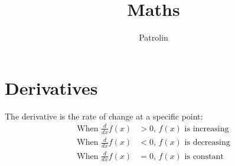 \documentclass[a4paper,14pt,twoside]{book}
\begin{document}
\newcommand*{\REF}[1]{\hyperref[{#1}]{\autoref*{#1} \nameref*{#1}}}
\newcommand{\LIM}[2]{\lim_{#1 \to #2}}
\newcommand{\D}{\F{d}{dx}}
\newcommand{\DD}[2]{\F{d #1}{d #2}}
\newcommand{\B}[1]{\left(#1\right)}
\newcommand{\F}[2]{\frac{#1}{#2}}
\newcommand{\T}[1]{\text{#1}}
\newcommand{\UB}[2]{\underbrace{#1}_{\N{#2}}}
\newcommand{\OB}[2]{\overbrace{#1}^{\N{#2}}}
\newcommand{\N}[1]{{\fontsize{10}{1cm}\selectfont \rlap{#1}}}
\newcommand*{\QED}{\hfill\ensuremath{\blacksquare}}

\title{Maths}
\author{Patrolin}

{\fontsize{14.4}{1cm}\selectfont
\maketitle
\tableofcontents
\chapter{Derivatives}
The derivative is the rate of change at a specific point$:$
\begin{align*}
	\T{When } \D f(x) & > 0 \T{, } f(x) \T{ is increasing} \\
	\T{When } \D f(x) & < 0 \T{, } f(x) \T{ is decreasing} \\
	\T{When } \D f(x) & = 0 \T{, } f(x) \T{ is constant}
\end{align*}
\pagebreak
}
\end{document}

